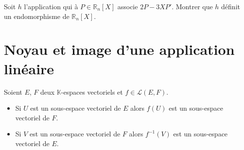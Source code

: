 \documentclass[a4paper,10pt]{report}
\begin{document}
\begin{exa} Soit $h$ l'application qui à $P \in \mathbb{R}_n[X]$ associe $2P-3XP'$. Montrer que $h$ définit un endomorphisme de $\mathbb{R}_n[X]$.
\end{exa}

\section{Noyau et image d'une application linéaire}

\begin{thm} Soient $E$, $F$ deux $\mathbb{K}$-espaces vectoriels et $f \in \mathcal{L}(E,F)$.

\begin{itemize}
\item Si $U$ est un sous-espace vectoriel de $E$ alors $f(U)$ est un sous-espace vectoriel de $F$.
\item Si $V$ est un sous-espace vectoriel de $F$ alors $f^{-1}(V)$ est un sous-espace vectoriel de $E$.
\end{itemize}
\end{thm}

\begin{preuve}
%
%
%
%
%

\vspace{12cm}
 \end{preuve}
 
\end{document}
